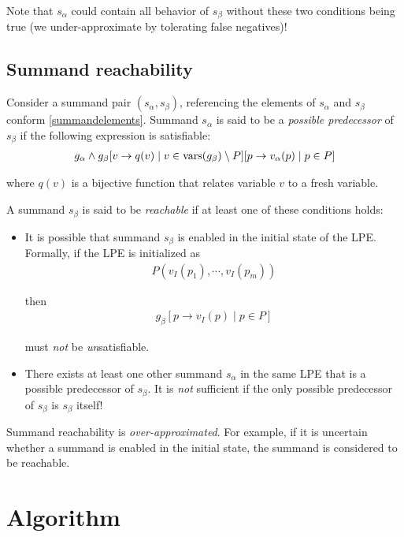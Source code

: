 Note that $s_\alpha$ could contain all behavior of $s_\beta$ without these two conditions being true (we under-approximate by tolerating false negatives)!

\subsection{Summand reachability}

Consider a summand pair $(s_\alpha, s_\beta)$, referencing the elements of $s_\alpha$ and $s_\beta$ conform \ref{summandelements}.
Summand $s_\alpha$ is said to be a \emph{possible predecessor} of $s_\beta$ if the following expression is satisfiable:
\begin{align*}
g_\alpha \land {g_\beta}[v \rightarrow q(v) \;|\; v \in \text{vars}(g_\beta) \setminus P][p \rightarrow v_\alpha(p) \;|\; p \in P]
\end{align*}

where $q(v)$ is a bijective function that relates variable $v$ to a fresh variable.

A summand $s_\beta$ is said to be \emph{reachable} if at least one of these conditions holds:

\begin{itemize}
\item It is possible that summand $s_\beta$ is enabled in the initial state of the LPE.
Formally, if the LPE is initialized as
\begin{align*}
P(v_I(p_1), \cdots{}, v_I(p_m))
\end{align*}

then
\begin{align*}
g_\beta[p \rightarrow v_I(p) \;|\; p \in P]
\end{align*}

must \emph{not} be \emph{un}satisfiable.

\item There exists at least one other summand $s_\alpha$ in the same LPE that is a possible predecessor of $s_\beta$.
It is \emph{not} sufficient if the only possible predecessor of $s_\beta$ is $s_\beta$ itself!
\end{itemize}

Summand reachability is \emph{over-approximated}.
For example, if it is uncertain whether a summand is enabled in the initial state, the summand is considered to be reachable.

\section{Algorithm}

